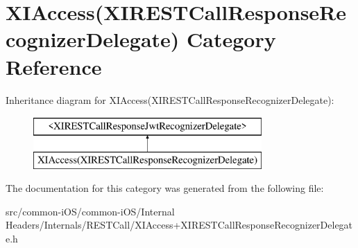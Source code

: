 \hypertarget{category_x_i_access_07_x_i_r_e_s_t_call_response_recognizer_delegate_08}{}\section{X\+I\+Access(X\+I\+R\+E\+S\+T\+Call\+Response\+Recognizer\+Delegate) Category Reference}
\label{category_x_i_access_07_x_i_r_e_s_t_call_response_recognizer_delegate_08}
Inheritance diagram for X\+I\+Access(X\+I\+R\+E\+S\+T\+Call\+Response\+Recognizer\+Delegate)\+:\begin{figure}[H]
\begin{center}
\leavevmode
\includegraphics[height=2.000000cm]{category_x_i_access_07_x_i_r_e_s_t_call_response_recognizer_delegate_08}
\end{center}
\end{figure}


The documentation for this category was generated from the following file\+:\begin{DoxyCompactItemize}
\item 
src/common-\/i\+O\+S/common-\/i\+O\+S/\+Internal Headers/\+Internals/\+R\+E\+S\+T\+Call/X\+I\+Access+\+X\+I\+R\+E\+S\+T\+Call\+Response\+Recognizer\+Delegate.\+h\end{DoxyCompactItemize}

